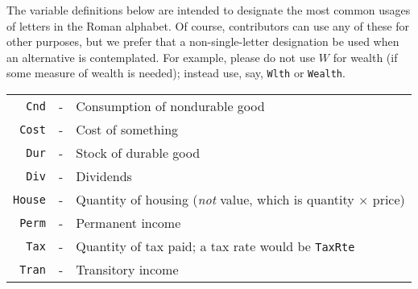 
The variable definitions below are intended to designate the most common usages of letters in the Roman alphabet.  Of course, contributors can use any of these for other purposes, but we prefer that a non-single-letter designation be used when an alternative is contemplated.  For example, please do not use $W$ for wealth (if some measure of wealth is needed); instead use, say, \texttt{Wlth} or \texttt{Wealth}.

\begin{table}[h]
\begin{tabular}{rcl}
\\  \texttt{Cnd}   & - & Consumption of nondurable good
\\  \texttt{Cost}  & - & Cost of something
\\  \texttt{Dur}   & - & Stock of durable good
\\  \texttt{Div}   & - & Dividends
\\  \texttt{House} & - & Quantity of housing ({\it not} value, which is quantity $\times$ price)
\\  \texttt{Perm}  & - & Permanent income
\\  \texttt{Tax}   & - & Quantity of tax paid; a tax rate would be \texttt{TaxRte}
\\  \texttt{Tran}  & - & Transitory income
\end{tabular}
\end{table}

